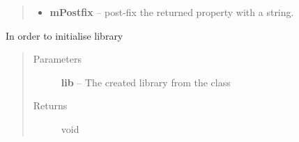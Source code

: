 \documentclass[letterpaper,10pt,english]{sphinxmanual}
\begin{document}
\begin{fulllineitems}
\begin{fulllineitems}
\begin{quote}
\begin{description}
\begin{itemize}
\item {} 
\textbf{mPostfix} -- post-fix the returned property with a string.

\end{itemize}

\end{description}\end{quote}

\end{fulllineitems}


\begin{fulllineitems}
\label{eqparse:eqparse.baseparse.BaseParse.get_names}
\end{fulllineitems}


\begin{fulllineitems}
\label{eqparse:eqparse.baseparse.BaseParse.get_only_names}
\end{fulllineitems}


\begin{fulllineitems}
\label{eqparse:eqparse.baseparse.BaseParse.initialise_library}
In order to initialise library
\begin{quote}\begin{description}
\item[{Parameters}] \leavevmode
\textbf{lib} -- The created library from the  class

\item[{Returns}] \leavevmode
void

\end{description}\end{quote}

\end{fulllineitems}


\begin{fulllineitems}
\label{eqparse:eqparse.baseparse.BaseParse.new_dependancy_index}
\end{fulllineitems}


\end{fulllineitems}
\end{document}
